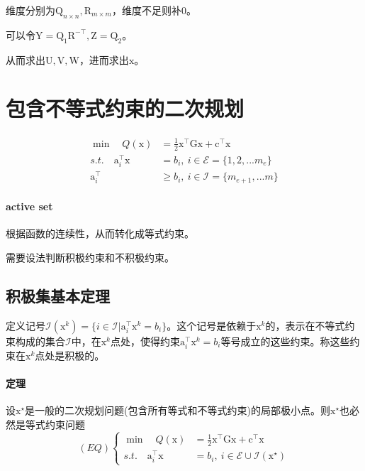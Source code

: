 \documentclass[a4paper]{D:/repositories/MyDGP/latex/PaperReadingLog}
\begin{document}
维度分别为$\mathrm{Q}_{n\times n},\mathrm{R}_{m\times m}$，维度不足则补0。

可以令$\mathrm{Y}=\mathrm{Q}_1\mathrm{R}^{-\top},\mathrm{Z}=\mathrm{Q}_2$。

从而求出$\mathrm{U},\mathrm{V},\mathrm{W}$，进而求出$\mathrm{x}$。

\section{包含不等式约束的二次规划}

$$
\begin{aligned}
    \min\quad Q(\mathrm{x})&=\frac{1}{2}\mathrm{x}^\top\mathrm{G}\mathrm{x}+\mathrm{c}^\top\mathrm{x}\\
    s.t.\quad \mathrm{a}_i^\top\mathrm{x}&=b_i,\ i\in\mathcal{E}=\{1,2,...m_e\}\\
    \mathrm{a}_i^\top&\ge b_i,\ i\in\mathcal{I}=\{m_{e+1},...m\}
\end{aligned}
$$

\paragraph{active set}根据函数的连续性，从而转化成等式约束。

需要设法判断积极约束和不积极约束。

\subsection{积极集基本定理}

定义记号$\mathcal{I}(\mathrm{x}^k)=\{i\in\mathcal{I}|\mathrm{a}_i^\top\mathrm{x}^k=b_i\}$。这个记号是依赖于$\mathrm{x}^k$的，表示在不等式约束构成的集合$\mathcal{I}$中，在$\mathrm{x}^k$点处，使得约束$\mathrm{a}_i^\top\mathrm{x}^k=b_i$等号成立的这些约束。称这些约束在$\mathrm{x}^k$点处是积极的。

\paragraph{定理} 设$\mathrm{x}^\star$是一般的二次规划问题(包含所有等式和不等式约束)的局部极小点。则$\mathrm{x}^\star$也必然是等式约束问题
$$
(EQ)\left\{\begin{aligned}
    \min\quad Q(\mathrm{x})&=\frac{1}{2}\mathrm{x}^\top \mathrm{G}\mathrm{x}+\mathrm{c}^\top \mathrm{x}\\
    s.t.\quad \mathrm{a}_i^\top\mathrm{x}&=b_i,\ i\in\mathcal{E}\cup\mathcal{I}(\mathrm{x}^\star)
\end{aligned}
\right.
$$
\end{document}
